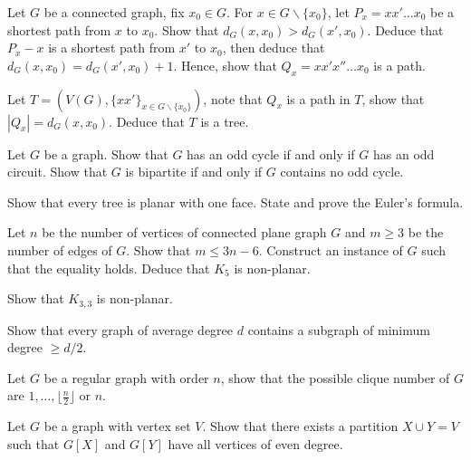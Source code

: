 \begin{question}{1.4}
	Let $G$ be a connected graph, fix $x_0 \in G$. For $x \in G\backslash \{x_0\}$, let $P_x = x x' \dots x_0$ be a shortest path from $x$ to $x_0$.  Show that $d_G(x,x_0) > d_G(x',x_0)$. Deduce that $P_x - x$ is a shortest path from $x'$ to $x_0$, then deduce that $d_G(x,x_0) = d_G(x',x_0) + 1$. Hence, show that $Q_x = xx'x''\dots x_0$ is a path.
	
	Let $T = (V(G), \{xx'\}_{x \in G\backslash \{x_0\}})$, note that $Q_x$ is a path in $T$, show that $|Q_x| = d_G(x,x_0)$. Deduce that $T$ is a tree.
\end{question}

\begin{question}{1.5}
	Let $G$ be a graph. Show that $G$ has an odd cycle if and only if $G$ has an odd circuit. Show that $G$ is bipartite if and only if $G$ contains no odd cycle.
\end{question}

\begin{question}{1.6}
	Show that every tree is planar with one face. State and prove the Euler's formula.
	
	Let $n$ be the number of vertices of connected plane graph $G$ and $m \geq 3$ be the number of edges of $G$. Show that $m \leq 3n - 6$. Construct an instance of $G$ such that the equality holds. Deduce that $K_5$ is non-planar.
	
	Show that $K_{3,3}$ is non-planar.
\end{question}

\begin{question}{1.7}
	Show that every graph of average degree $d$ contains a subgraph of minimum degree $\geq d/2$.
\end{question}

\begin{question}{8}
	Let $G$ be a regular graph with order $n$, show that the possible clique number of $G$ are $1, \dots, \lfloor \frac{n}{2}\rfloor$ or $n$. 
\end{question}

\begin{question}{1.9}
	Let $G$ be a graph with vertex set $V$. Show that there exists a partition $X\cup Y = V$ such that $G[X]$ and $G[Y]$ have all vertices of even degree.
\end{question}

